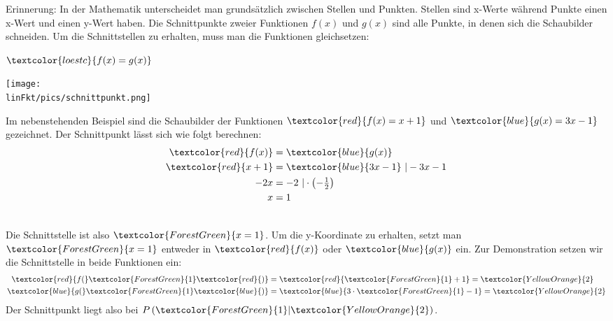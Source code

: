 Erinnerung: In der Mathematik unterscheidet man grundsätzlich zwischen Stellen und Punkten. Stellen sind x-Werte während Punkte einen x-Wert und einen y-Wert haben. Die Schnittpunkte zweier Funktionen $f(x)$ und $g(x)$ sind alle Punkte, in denen sich die Schaubilder schneiden. Um die Schnittstellen zu erhalten, muss man die Funktionen gleichsetzen:
\begin{tcolorbox}\centering
	$\textcolor{loestc}{f(x)=g(x)}$
\end{tcolorbox}
\begin{minipage}{0.49\textwidth}
	\texttt{[image: \\linFkt/pics/schnittpunkt.png]}
\end{minipage}
\begin{minipage}{0.49\textwidth}
	Im nebenstehenden Beispiel sind die Schaubilder der Funktionen $\textcolor{red}{f(x)=x+1}$ und $\textcolor{blue}{g(x)=3x-1}$ gezeichnet. Der Schnittpunkt lässt sich wie folgt berechnen:
	\begin{align*}
		\textcolor{red}{f(x)}&=\textcolor{blue}{g(x)}\\
		\textcolor{red}{x+1}&=\textcolor{blue}{3x-1}\ \rvert -3x-1\\
		-2x&=-2\ \rvert \cdot\left(-\tfrac{1}{2}\right)\\
		x&=1
	\end{align*}
\end{minipage}\smallskip\\
Die Schnittstelle ist also $\textcolor{ForestGreen}{x=1}$. Um die y-Koordinate zu erhalten, setzt man $\textcolor{ForestGreen}{x=1}$ entweder in $\textcolor{red}{f(x)}$ oder $\textcolor{blue}{g(x)}$ ein. Zur Demonstration setzen wir die Schnittstelle in beide Funktionen ein:
\begin{align*}
	\textcolor{red}{f(}\textcolor{ForestGreen}{1}\textcolor{red}{)}&=\textcolor{red}{\textcolor{ForestGreen}{1}+1}=\textcolor{YellowOrange}{2}\\
	\textcolor{blue}{g(}\textcolor{ForestGreen}{1}\textcolor{blue}{)}&=\textcolor{blue}{3\cdot \textcolor{ForestGreen}{1}-1}=\textcolor{YellowOrange}{2}
\end{align*}
Der Schnittpunkt liegt also bei $P\left(\textcolor{ForestGreen}{1}\lvert\textcolor{YellowOrange}{2}\right)$.
